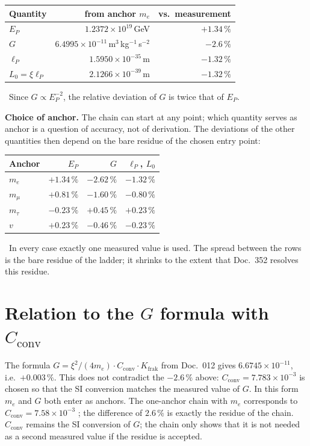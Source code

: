 \begin{center}
\begin{tabular}{@{}lrr@{}}
\toprule
\textbf{Quantity} & \textbf{from anchor $m_e$} & \textbf{vs.\ measurement}\\
\midrule
$E_P$    & $1.2372\times10^{19}$\,GeV & $+1.34\,\%$\\
$G$      & $6.4995\times10^{-11}$\,m$^3$\,kg$^{-1}$\,s$^{-2}$ & $-2.6\,\%$\\
$\ell_P$ & $1.5950\times10^{-35}$\,m & $-1.32\,\%$\\
$L_0=\xi\ell_P$ & $2.1266\times10^{-39}$\,m & $-1.32\,\%$\\
\bottomrule
\end{tabular}
\end{center}
\KM\ Since $G\propto E_P^{-2}$, the relative deviation of $G$ is twice that of $E_P$.

\textbf{Choice of anchor.} The chain can start at any point; which quantity serves as
anchor is a question of accuracy, not of derivation. The deviations of the other
quantities then depend on the bare residue of the chosen entry point:

\begin{center}
\begin{tabular}{@{}lrrr@{}}
\toprule
\textbf{Anchor} & $E_P$ & $G$ & $\ell_P$, $L_0$\\
\midrule
$m_e$    & $+1.34\,\%$ & $-2.62\,\%$ & $-1.32\,\%$\\
$m_\mu$  & $+0.81\,\%$ & $-1.60\,\%$ & $-0.80\,\%$\\
$m_\tau$ & $-0.23\,\%$ & $+0.45\,\%$ & $+0.23\,\%$\\
$v$      & $+0.23\,\%$ & $-0.46\,\%$ & $-0.23\,\%$\\
\bottomrule
\end{tabular}
\end{center}
\KM\ In every case exactly one measured value is used. The spread between the rows is
the bare residue of the ladder; it shrinks to the extent that Doc.~352 resolves this
residue.

\section{Relation to the \texorpdfstring{$G$}{G} formula with \texorpdfstring{$C_{\text{conv}}$}{C\_conv}}
The formula $G=\xi^2/(4m_e)\cdot C_{\text{conv}}\cdot K_{\text{frak}}$ from Doc.~012
gives $6.6745\times10^{-11}$, i.e.\ $+0.003\,\%$. This does not contradict the
$-2.6\,\%$ above: $C_{\text{conv}}=7.783\times10^{-3}$ is chosen so that the SI
conversion matches the measured value of $G$. In this form $m_e$ and $G$ both enter as
anchors. The one-anchor chain with $m_e$ corresponds to
$C_{\text{conv}}=7.58\times10^{-3}$ \KM; the difference of $2.6\,\%$ is exactly the
residue of the chain. $C_{\text{conv}}$ remains the SI conversion of $G$; the chain only
shows that it is not needed as a second measured value if the residue is accepted.

